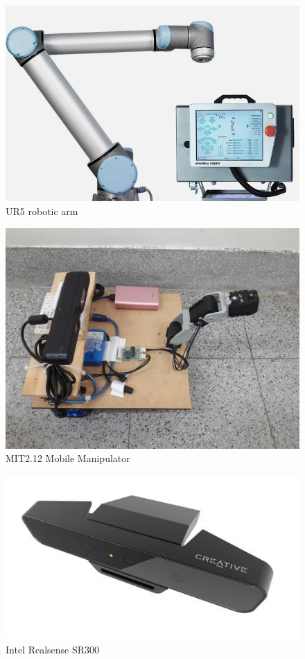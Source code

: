 \documentclass[letterpaper, 10 pt, conference]{ieeeconf}  %
\begin{document}
\begin{figure}[!b]
\includegraphics[width=0.7\columnwidth]{UR5}
\centering
\caption{UR5 robotic arm}
 \label{figure:ur5}
\end{figure}

\begin{figure}[h]
\includegraphics[width=0.7\columnwidth]{robot}
\centering
\caption{MIT2.12 Mobile Manipulator}
 \label{figure:mit212mm}
\end{figure}

\begin{figure}[h]
\includegraphics[width=0.7\columnwidth]{RealSense_Camera_SR300_SPL}
\centering
\caption{Intel Realsense SR300}
 \label{figure:sr300}
\end{figure}
\end{document}
